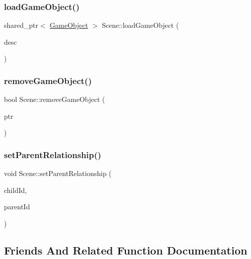 \subsubsection{\texorpdfstring{load\+Game\+Object()}{loadGameObject()}}
{\footnotesize\ttfamily shared\+\_\+ptr$<$ \hyperlink{class_mason_1_1_game_object}{Game\+Object} $>$ Scene\+::load\+Game\+Object (\begin{DoxyParamCaption}\item[{\hyperlink{class_mason_1_1_game_object_descriptor}{Game\+Object\+Descriptor}}]{desc }\end{DoxyParamCaption})}

\hypertarget{class_mason_1_1_scene_aad5427fcdd330f65dc4e7b1e627afce4}{}\label{class_mason_1_1_scene_aad5427fcdd330f65dc4e7b1e627afce4} 
\subsubsection{\texorpdfstring{remove\+Game\+Object()}{removeGameObject()}}
{\footnotesize\ttfamily bool Scene\+::remove\+Game\+Object (\begin{DoxyParamCaption}\item[{std\+::shared\+\_\+ptr$<$ \hyperlink{class_mason_1_1_game_object}{Game\+Object} $>$}]{ptr }\end{DoxyParamCaption})}

\hypertarget{class_mason_1_1_scene_a2d10aca9d364dc70935795a1436f353d}{}\label{class_mason_1_1_scene_a2d10aca9d364dc70935795a1436f353d} 
\subsubsection{\texorpdfstring{set\+Parent\+Relationship()}{setParentRelationship()}}
{\footnotesize\ttfamily void Scene\+::set\+Parent\+Relationship (\begin{DoxyParamCaption}\item[{int}]{child\+Id,  }\item[{int}]{parent\+Id }\end{DoxyParamCaption})}



\subsection{Friends And Related Function Documentation}
\hypertarget{class_mason_1_1_scene_a3e1914489e4bed4f9f23cdeab34a43dc}{}\label{class_mason_1_1_scene_a3e1914489e4bed4f9f23cdeab34a43dc} 

